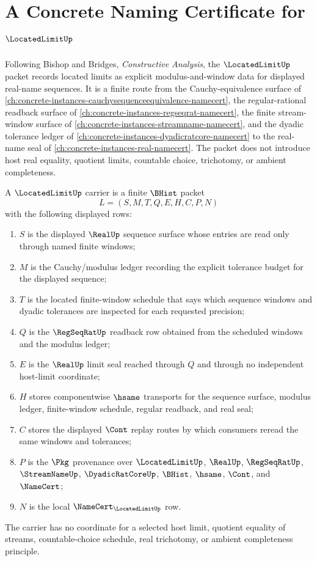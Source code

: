 \chapter{A Concrete Naming Certificate for $\LocatedLimitUp$}
\label{ch:concrete-instances-locatedlimit-namecert}

Following Bishop and Bridges, \emph{Constructive Analysis}, the $\LocatedLimitUp$ packet records located limits as explicit modulus-and-window data for displayed real-name sequences. It is a finite route from the Cauchy-equivalence surface of \autoref{ch:concrete-instances-cauchysequenceequivalence-namecert}, the regular-rational readback surface of \autoref{ch:concrete-instances-regseqrat-namecert}, the finite stream-window surface of \autoref{ch:concrete-instances-streamname-namecert}, and the dyadic tolerance ledger of \autoref{ch:concrete-instances-dyadicratcore-namecert} to the real-name seal of \autoref{ch:concrete-instances-real-namecert}. The packet does not introduce host real equality, quotient limits, countable choice, trichotomy, or ambient completeness.

\begin{definition}
\label{def:located-limit-carrier}
A $\LocatedLimitUp$ carrier is a finite $\BHist$ packet
$$
L=(S,M,T,Q,E,H,C,P,N)
$$
with the following displayed rows:
\begin{enumerate}
\item $S$ is the displayed $\RealUp$ sequence surface whose entries are read only through named finite windows;
\item $M$ is the Cauchy/modulus ledger recording the explicit tolerance budget for the displayed sequence;
\item $T$ is the located finite-window schedule that says which sequence windows and dyadic tolerances are inspected for each requested precision;
\item $Q$ is the $\RegSeqRatUp$ readback row obtained from the scheduled windows and the modulus ledger;
\item $E$ is the $\RealUp$ limit seal reached through $Q$ and through no independent host-limit coordinate;
\item $H$ stores componentwise $\hsame$ transports for the sequence surface, modulus ledger, finite-window schedule, regular readback, and real seal;
\item $C$ stores the displayed $\Cont$ replay routes by which consumers reread the same windows and tolerances;
\item $P$ is the $\Pkg$ provenance over $\LocatedLimitUp$, $\RealUp$, $\RegSeqRatUp$, $\StreamNameUp$, $\DyadicRatCoreUp$, $\BHist$, $\hsame$, $\Cont$, and $\NameCert$;
\item $N$ is the local $\NameCert_{\LocatedLimitUp}$ row.
\end{enumerate}
The carrier has no coordinate for a selected host limit, quotient equality of streams, countable-choice schedule, real trichotomy, or ambient completeness principle.
\end{definition}

